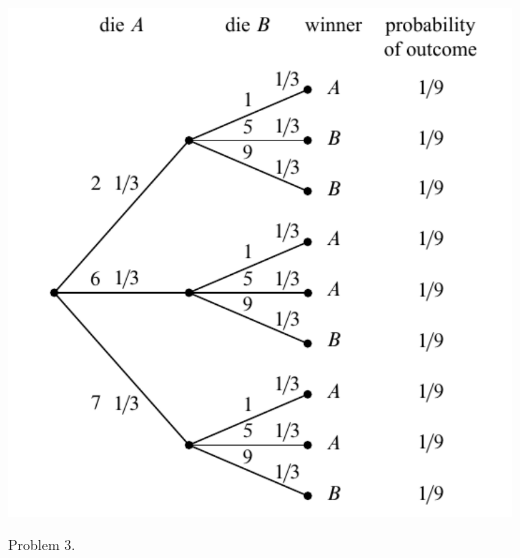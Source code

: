 \begin{frame}
  \begin{block}{}
    \begin{center}
      \includegraphics[scale=0.55]{fig177.pdf}
    \end{center}
  \end{block}
\end{frame}
 
\begin{frame}
  \begin{xrcs}
   Problem 3.
  \end{xrcs}
\end{frame}



